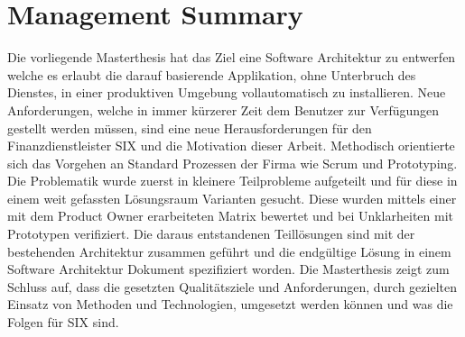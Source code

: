 \chapter{Management Summary}

Die vorliegende Masterthesis hat das Ziel eine Software Architektur zu entwerfen welche es erlaubt die darauf basierende Applikation, ohne Unterbruch des Dienstes, in einer produktiven Umgebung vollautomatisch zu installieren.\newline\newline
Neue Anforderungen, welche in immer kürzerer Zeit dem Benutzer zur Verfügungen gestellt werden müssen, sind eine neue Herausforderungen für den Finanzdienstleister SIX und die Motivation dieser Arbeit.\newline\newline
Methodisch orientierte sich das Vorgehen an Standard Prozessen der Firma wie Scrum und Prototyping. Die Problematik wurde zuerst in kleinere Teilprobleme aufgeteilt und für diese in einem weit gefassten Lösungsraum Varianten gesucht. Diese wurden mittels einer mit dem Product Owner erarbeiteten Matrix bewertet und bei Unklarheiten mit Prototypen verifiziert. Die daraus entstandenen Teillösungen sind mit der bestehenden Architektur zusammen geführt und die endgültige Lösung in einem Software Architektur Dokument spezifiziert worden.\newline\newline
Die Masterthesis zeigt zum Schluss auf, dass die gesetzten Qualitätsziele und Anforderungen, durch gezielten Einsatz von Methoden und Technologien, umgesetzt werden können und was die Folgen für SIX sind.